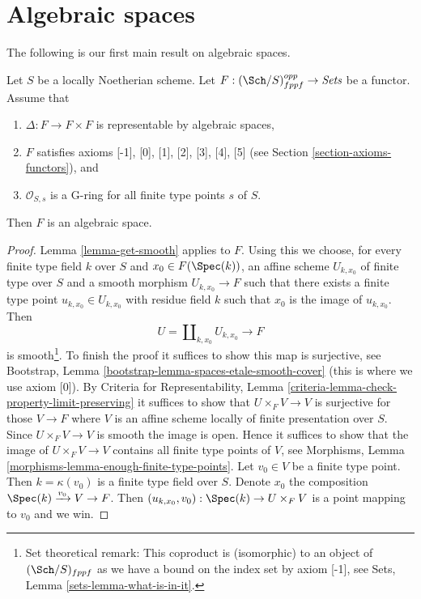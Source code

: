 \section{Algebraic spaces}
\label{section-algebraic-spaces}

\noindent
The following is our first main result on algebraic spaces.

\begin{proposition}
\label{proposition-spaces-diagonal-representable}
Let $S$ be a locally Noetherian scheme. Let
$F : (\Sch/S)_{fppf}^{opp} \to \textit{Sets}$ be a functor. Assume that
\begin{enumerate}
\item $\Delta : F \to F \times F$ is representable by algebraic spaces,
\item $F$ satisfies axioms [-1], [0], [1], [2], [3], [4], [5]
(see Section \ref{section-axioms-functors}), and
\item $\mathcal{O}_{S, s}$ is a G-ring for all finite type points $s$ of $S$.
\end{enumerate}
Then $F$ is an algebraic space.
\end{proposition}

\begin{proof}
Lemma \ref{lemma-get-smooth} applies to $F$. Using this we
choose, for every finite type field $k$ over $S$ and $x_0 \in F(\Spec(k))$,
an affine scheme $U_{k, x_0}$ of finite type over $S$ and a smooth morphism
$U_{k, x_0} \to F$ such that there exists a finite type point
$u_{k, x_0} \in U_{k, x_0}$ with residue field $k$ such that $x_0$
is the image of $u_{k, x_0}$. Then
$$
U = \coprod\nolimits_{k, x_0} U_{k, x_0} \longrightarrow F
$$
is smooth\footnote{Set theoretical remark: This coproduct is (isomorphic)
to an object of $(\Sch/S)_{fppf}$ as we have a bound on the index set
by axiom [-1], see Sets, Lemma \ref{sets-lemma-what-is-in-it}.}.
To finish the proof it suffices to show this map is surjective,
see Bootstrap, Lemma \ref{bootstrap-lemma-spaces-etale-smooth-cover}
(this is where we use axiom [0]). By Criteria for Representability, Lemma
\ref{criteria-lemma-check-property-limit-preserving}
it suffices to show that $U \times_F V \to V$ is surjective for those
$V \to F$ where $V$ is an affine scheme locally of finite presentation
over $S$. Since $U \times_F V \to V$ is smooth the image is open. Hence
it suffices to show that the image of $U \times_F V \to V$ contains all
finite type points of $V$, see
Morphisms, Lemma \ref{morphisms-lemma-enough-finite-type-points}.
Let $v_0 \in V$ be a finite type point. Then $k = \kappa(v_0)$ is
a finite type field over $S$. Denote $x_0$ the composition
$\Spec(k) \xrightarrow{v_0} V \to F$. Then
$(u_{k, x_0}, v_0) : \Spec(k) \to U \times_F V$ is a point mapping to
$v_0$ and we win.
\end{proof}

